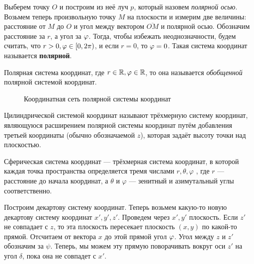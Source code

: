 	\Pagebreak

	\begin{Def}
		Выберем точку $O$ и построим из неё луч $p$, который назовем \textit{полярной осью}. Возьмем теперь произвольную точку $M$ на плоскости и измерим две величины:
		расстояние от $M$ до $O$ и угол между вектором $\overline{OM}$ и полярной осью. Обозначим расстояние за $r$, а угол за $\varphi$.
		Тогда, чтобы избежать неоднозначности, будем считать, что $r > 0, \varphi \in [0, 2\pi)$, и если $r = 0$, то $\varphi = 0$.    
		Такая система координат называется \textbf{полярной}.		

	\end{Def}

	\begin{figure}[h]
		\centering
		\def\svgwidth{0.3\columnwidth}
		
	\end{figure}

	\begin{Def}
		Полярная система координат, где $r \in \mathbb{R}, \varphi \in \mathbb{R}$, то она называется \textit{обобщенной} полярной системой координат.
	\end{Def}

	\begin{figure}[h!]
		\centering
		\def\svgwidth{0.3\columnwidth}
		
		\caption{Координатная сеть полярной системы координат}
	\end{figure}

	\begin{Def}
		Цилиндрической системой координат называют трёхмерную систему координат, являющуюся расширением полярной системы координат путём добавления третьей координаты (обычно обозначаемой ${\displaystyle z}$), которая задаёт высоту точки над плоскостью.
	\end{Def}

	\begin{Def}
		Сферическая система координат — трёхмерная система координат, в которой каждая точка пространства определяется тремя числами $r, \theta, \varphi$ , где $r$ — расстояние до начала координат, а $\theta$ и $\varphi$ — зенитный и азимутальный углы соответственно.
	\end{Def}



	Построим декартову систему координат. Теперь возьмем какую-то новую декартову систему координат $x', y', z'$.
	Проведем через $x', y'$ плоскость. Если $z'$ не совпадает с $z$, то эта плоскость пересекает плоскость $(x, y)$ по какой-то прямой.
	Отсчитаем от вектора $x$ до этой прямой угол $\varphi$. Угол между $z$ и $z'$ обозначим за $\psi$.
	Теперь, мы можем эту прямую поворачивать вокруг оси $z'$ на угол $\delta$, пока она не совпадет с $x'$.
	
